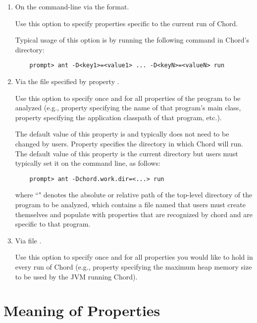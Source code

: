 \begin{enumerate}
\item

On the command-line via the  format.

Use this option to specify properties specific to the current run of Chord.

Typical usage of this option is by running the following command in Chord's  directory:
\begin{verbatim}
    prompt> ant -D<key1>=<value1> ... -D<keyN>=<valueN> run
\end{verbatim}

\item

Via the file specified by property .

Use this option to specify once and for all properties of the program to
be analyzed (e.g., property  specifying the name of that program's main class, property 
specifying the application classpath of that program, etc.).

The default value of this property is  and typically
does not need to be changed by users.
Property  specifies the directory in which Chord will run.
The default value of this property is the current directory but users must typically set
it on the command line, as follows:

\begin{verbatim}
    prompt> ant -Dchord.work.dir=<...> run
\end{verbatim}
where ``" denotes the absolute or relative path of the top-level directory of
the program to be analyzed, which contains a file named  that users
must create themselves and populate with properties that are recognized by chord and
are specific to that program.

\item

Via file .

Use this option to specify once and for all properties you would like to hold in every run of Chord
(e.g., property  specifying the maximum heap memory size to be used by the
JVM running Chord).
\end{enumerate}

\section{Meaning of Properties}
\label{sec:properties-meaning}

